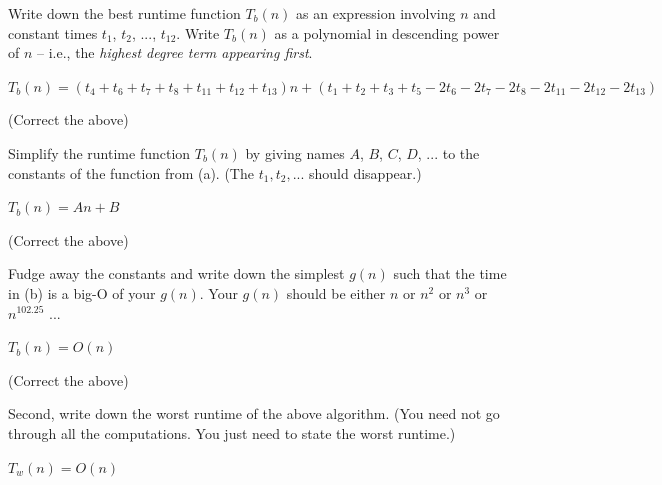\nextq
Write down the best runtime function $T_b(n)$ as an expression involving
$n$ and constant times
$t_{1}$, $t_{2}$, ..., $t_{12}$.
Write $T_b(n)$ as a polynomial in descending power of $n$ -- i.e.,
the \textit{highest degree term appearing first}.
\\
\ANSWER
\begin{answerlong}
$T_b(n) = (t_{4} + t_{6} + t_{7} + t_{8} + t_{11} + t_{12} + t_{13})n + (t_{1} + t_{2} + t_{3} + t_{5} - 2t_{6} - 2t_{7} - 2t_{8} - 2t_{11} - 2t_{12} - 2t_{13})$
\end{answerlong}
(Correct the above)

\nextq
Simplify the runtime function $T_b(n)$
by giving names $A$, $B$, $C$, $D$, ...
to the constants of the function from (a). (The $t_1, t_2, ...$ should
disappear.)
\\
\ANSWER
\begin{answerlong}
$T_b(n) = An + B$
\end{answerlong}
(Correct the above)

\nextq
Fudge away the constants and write down the simplest $g(n)$ such
that the time in (b) is a big-O of your $g(n)$.
Your $g(n)$ should be either $n$ or $n^2$ or $n^3$ or $n^{102.25}$ ...
\\
\ANSWER
\begin{answerlong}
$T_b(n) = O(n)$
\end{answerlong}
(Correct the above)

\nextq
Second, write down the worst runtime of the above algorithm.
(You need not go through all the computations. You just need to state
the worst runtime.)
\\
\ANSWER
\begin{answerlong}
$T_w(n) = O(n)$
\end{answerlong}


